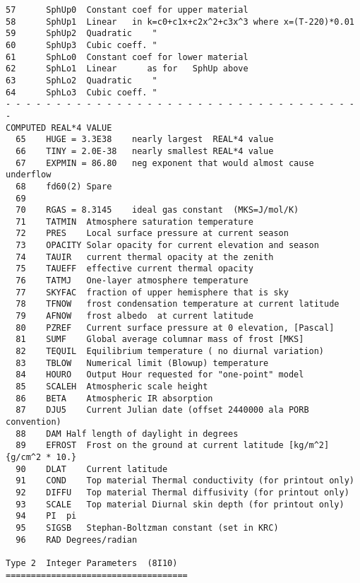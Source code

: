 \begin{verbatim}
57      SphUp0  Constant coef for upper material 
58      SphUp1  Linear   in k=c0+c1x+c2x^2+c3x^3 where x=(T-220)*0.01
59      SphUp2  Quadratic    " 
60      SphUp3  Cubic coeff. "
61      SphLo0  Constant coef for lower material 
62      SphLo1  Linear      as for   SphUp above
63      SphLo2  Quadratic    "
64      SphLo3  Cubic coeff. "
- - - - - - - - - - - - - - - - - - - - - - - - - - - - - - - - - - - -
COMPUTED REAL*4 VALUE	
  65    HUGE = 3.3E38	 nearly largest  REAL*4 value
  66    TINY = 2.0E-38	 nearly smallest REAL*4 value
  67    EXPMIN = 86.80	 neg exponent that would almost cause underflow
  68    fd60(2) Spare
  69    
  70    RGAS = 8.3145	 ideal gas constant  (MKS=J/mol/K)
  71    TATMIN  Atmosphere saturation temperature
  72    PRES    Local surface pressure at current season
  73    OPACITY Solar opacity for current elevation and season
  74    TAUIR   current thermal opacity at the zenith
  75    TAUEFF  effective current thermal opacity 
  76    TATMJ   One-layer atmosphere temperature
  77 	SKYFAC	fraction of upper hemisphere that is sky
  78 	TFNOW	frost condensation temperature at current latitude
  79 	AFNOW	frost albedo  at current latitude
  80 	PZREF	Current surface pressure at 0 elevation, [Pascal]
  81	SUMF	Global average columnar mass of frost [MKS]
  82	TEQUIL	Equilibrium temperature ( no diurnal variation)
  83	TBLOW	Numerical limit (Blowup) temperature
  84	HOURO	Output Hour requested for "one-point" model
  85	SCALEH	Atmospheric scale height
  86	BETA	Atmospheric IR absorption
  87	DJU5	Current Julian date (offset 2440000 ala PORB convention)
  88	DAM	Half length of daylight in degrees
  89	EFROST	Frost on the ground at current latitude [kg/m^2] {g/cm^2 * 10.} 
  90	DLAT	Current latitude
  91	COND 	Top material Thermal conductivity (for printout only)
  92	DIFFU	Top material Thermal diffusivity (for printout only)
  93	SCALE	Top material Diurnal skin depth (for printout only)
  94	PI	pi
  95	SIGSB	Stephan-Boltzman constant (set in KRC)
  96	RAD	Degrees/radian

Type 2	Integer Parameters	(8I10) ====================================


\end{verbatim}
